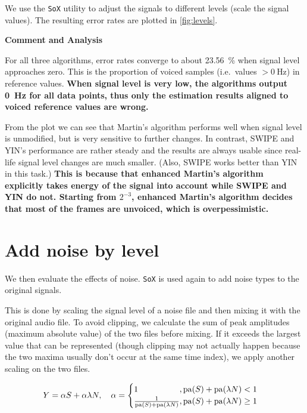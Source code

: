 \documentclass[11pt,a4paper]{report}
\begin{document}
We use the \texttt{SoX} utility to adjust the signals to different levels (scale the signal values).
The resulting error rates are plotted in \autoref{fig:levels}.

\begin{mdframed}
\textbf{Comment and Analysis}

\bigskip

For all three algorithms, error rates converge to about \SI{23.56}{\percent} when signal level approaches zero.
This is the proportion of voiced samples (i.e.\, values \( > \SI{0}{\hertz} \)) in reference values.
\textbf{When signal level is very low, the algorithms output \SI{0}{\hertz} for all data points, thus only the estimation results aligned to voiced reference values are wrong.}

\smallskip

From the plot we can see that Martin's algorithm performs well when signal level is unmodified, but is very sensitive to further changes.
In contrast, SWIPE and YIN's performance are rather steady and the results are always usable since real-life signal level changes are much smaller.
(Also, SWIPE works better than YIN in this task.) \textbf{This is because that enhanced Martin's algorithm explicitly takes energy of the signal into account while SWIPE and YIN do not.
Starting from \(2^{-3}\), enhanced Martin's algorithm decides that most of the frames are unvoiced, which is overpessimistic.}
\end{mdframed}

\section{Add noise by level}

We then evaluate the effects of noise.
\texttt{SoX} is used again to add noise types to the original signals.

This is done by scaling the signal level of a noise file and then mixing it with the original audio file.
To avoid clipping, we calculate the sum of peak amplitudes (maximum absolute value) of the two files before mixing.
If it exceeds the largest value that can be represented (though clipping may not actually happen because the two maxima usually don't occur at the same time index), we apply another scaling on the two files.

\begin{equation}
  Y = \alpha S + \alpha \lambda N, \quad
  \alpha = \begin{cases}
    \mathrlap{1}\hphantom{\frac{1}{\mathrm{pa}(S) + \mathrm{pa}(\lambda N)}}, \mathrm{pa}(S) + \mathrm{pa}(\lambda N) < 1 \\
    \frac{1}{\mathrm{pa}(S) + \mathrm{pa}(\lambda N)}, \mathrm{pa}(S) + \mathrm{pa}(\lambda N) \geq 1
  \end{cases}
\end{equation}
\end{document}

